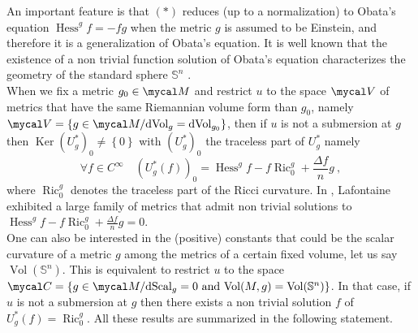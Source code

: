 \documentclass[a4paper,11pt,leqno]{amsart}
\numberwithin{equation}{section}
\theoremstyle{main}
\begin{document}
An important feature is that $(*)$ reduces (up to a normalization) to Obata's equation ${\operatorname{Hess}}^g f =-f  g $ when the metric $g$ is assumed to be Einstein, and therefore it is a generalization of Obata's equation. It is well known that the existence of a non trivial function solution of Obata's equation characterizes the geometry of the standard sphere ${{\mathbb S^{n}}}$ \cite{O}.\\
When we fix a metric $g_0\in \mycal M$ and restrict $u$ to the space $\mycal V$ of metrics that have the same Riemannian volume form than $g_0$, namely $\mycal V= \left\{g\in\mycal M/ {\operatorname{dVol}}_g= {\operatorname{dVol}}_{g_0 }\right\}$, then if $u$ is not a submersion at $g$ then ${\operatorname{Ker}} \left(U^*_g\right)_0\neq \left\{0\right\}$  with $\left(U^*_g\right)_0$ the traceless part of $U^*_g$ namely
$$\forall f \in C^\infty \quad \left(U^*_g(f)\right)_0= {\operatorname{Hess}}^g f -f {\operatorname{Ric}}^g_0 + \frac{\Delta f}{n} g \ ,$$
where ${\operatorname{Ric}}_0^g$ denotes the traceless part of the Ricci curvature. In \cite{L}, Lafontaine exhibited a large family of metrics that admit non trivial solutions to ${\operatorname{Hess}}^g f -f {\operatorname{Ric}}^g_0 + \frac{\Delta f}{n} g=0$.\\
One can also be interested in the (positive) constants that could be the scalar curvature of a metric $g$ among the metrics of a certain fixed volume, let us say ${\operatorname{Vol}}({{\mathbb S^{n}}})$. This is equivalent to restrict $u$ to the space $\mycal C =  \left\{g\in\mycal M/ {{\rm d}}{\operatorname{Scal}}_g= 0 \textrm{ and } {\operatorname{Vol}}(M,g)={\operatorname{Vol}}({{\mathbb S^{n}}})\right\}$. In that case, if $u$ is not a submersion at $g$ then there exists a non trivial solution $f$ of $U^*_g(f)={\operatorname{Ric}}^g_0$. All these results are summarized in the following statement.
\end{document}
